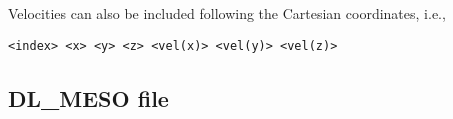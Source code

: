 Velocities can also be included following the Cartesian coordinates, i.e.,
\begin{lstlisting}
<index> <x> <y> <z> <vel(x)> <vel(y)> <vel(z)>
\end{lstlisting}

\subsection{DL\_MESO \field file} %

\begin{comment}
This file can be used to get mass and/or charge of bead types (only if
missing from the \vsf file) as well as bond parameters and angle and angle
parameters for molecules (these informations are not stored in the \vsf
file).

The format of this file is taken directly from the
\href{https://www.scd.stfc.ac.uk/Pages/DL_MESO.aspx}{DL\_MESO}
software. If the \field file is used only to read mass and/or charge
information about bead types, only the \tt{species} section is required.
This section contains a header line
\begin{verbatim}species <int>\end{verbatim}
where \tt{<int>} is the number of bead types (or species as called by the
DL\_MESO software) in the \field file. Every bead type is then describe by
a single line:
\begin{verbatim}<name> <m> <q> <n>\end{verbatim}
where \tt{<name>} is the bead type name (that must correspond to a bead
name in the \vsf file if its mass/charge is to be read from the \field
file), \tt{m} and \tt{q} are the bead's mass and charge, respectively,
and \tt{<n>} is the number unbonded beads of that type (i.e., beads
not present in a molecule). Not all bead types in the \vsf file must be
present in the \field file. Blank lines are not allowed in the \tt{species}
section.

Should bond and angle information be read as well, a \tt{molecules} section
must follow the \tt{species} section. This section starts with a header line:
\begin{verbatim}molecule <int>\end{verbatim}
where \tt{<int>} is the number of types of molecules. The header is
followed by \tt{<int>} blocks, each describing a single molecule type and
ending with a line:
\begin{verbatim}finish\end{verbatim}
Every molecular block starts with two lines:
\begin{verbatim}<name>
nummols <n>\end{verbatim}
where \tt{<name>} is the molecule's name (that must correspond to a
\tt{resname} in the \vsf file if the bond/angle information is to be read)
and \tt{<n>} is the number of molecules of this type (that does not have to
correspond to the number of \tt{<name>} molecules in the \vsf file).


\end{comment}
